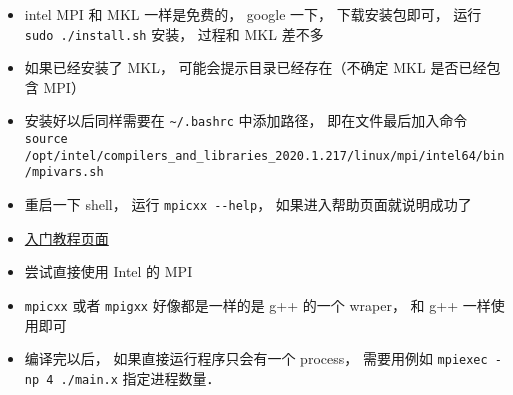 
\begin{issues}
\issueDraft
\end{issues}

\begin{itemize}
\item intel MPI 和 MKL 一样是免费的， google 一下， 下载安装包即可， 运行 \verb`sudo ./install.sh` 安装， 过程和 MKL 差不多
\item 如果已经安装了 MKL， 可能会提示目录已经存在（不确定 MKL 是否已经包含 MPI）
\item 安装好以后同样需要在 \verb`~/.bashrc` 中添加路径， 即在文件最后加入命令 \verb`source /opt/intel/compilers_and_libraries_2020.1.217/linux/mpi/intel64/bin/mpivars.sh`
\item 重启一下 shell， 运行 \verb`mpicxx --help`， 如果进入帮助页面就说明成功了


\item \href{https://people.sc.fsu.edu/~jburkardt/cpp_src/hello_mpi/hello_mpi.html}{入门教程页面}
\item 尝试直接使用 Intel 的 MPI
\item \verb`mpicxx` 或者 \verb`mpigxx` 好像都是一样的是 g++ 的一个 wraper， 和 g++ 一样使用即可
\item 编译完以后， 如果直接运行程序只会有一个 process， 需要用例如 \verb|mpiexec -np 4 ./main.x| 指定进程数量．
\end{itemize}
